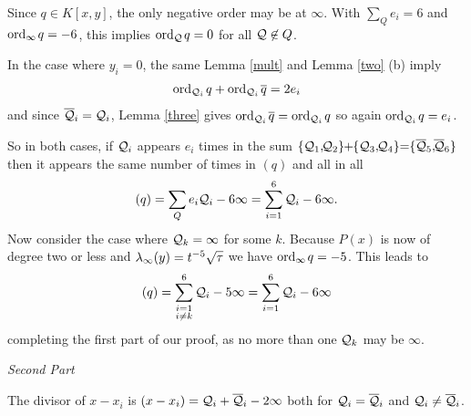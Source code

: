 \documentclass[english,11pt,a4paper]{article}
\begin{document}
Since $q \in K[x,y]$, the only negative order may be at $\infty$. With $\sum_Q e_i = 6$ and $\text{ord}_{\infty}\hspace{0.4mm} q = -6$, this implies $\text{ord}_{\mathcal{Q}}\hspace{0.4mm} q = 0$ for all $\mathcal{Q} \not \in Q$.

In the case where $y_i = 0$, the same Lemma \ref{mult} and Lemma \ref{two} (b) imply
\begin{align*}
  \text{ord}_{\mathcal{Q}_i}\hspace{0.4mm} q + \text{ord}_{\mathcal{Q}_i}\hspace{0.4mm} \overline q = 2e_i
\end{align*}
and since $\overline {\mathcal{Q}}_i = \mathcal{Q}_i$, Lemma \ref{three} gives $\text{ord}_{\mathcal{Q}_i}\hspace{0.4mm} \overline q = \text{ord}_{\mathcal{Q}_i}\hspace{0.4mm} q$ so again $\text{ord}_{\mathcal{Q}_i}\hspace{0.4mm} q = e_i$.

So in both cases, if $\mathcal{Q}_i$ appears $e_i$ times in the sum $\{ \q_1 ,\hspace{-1mm} \q_2\}\hspace{-1mm}+\hspace{-1mm}\{\q_3 ,\hspace{-1mm} \q_4\} \hspace{-1mm}=\hspace{-1mm} \{\bar \q_5 ,\hspace{-1mm} \bar \q_6 \}$ then it appears the same number of times in $(q)$ and all in all
\begin{align*}
  (q) = \sum_Q e_i \mathcal{Q}_i - 6 \infty = \sum_{i=1}^6 \mathcal{Q}_i - 6 \infty.
\end{align*}
Now consider the case where $\mathcal{Q}_k = \infty$ for some $k$. Because $P(x)$ is now of degree two or less and $\lambda_{\infty}(y) = t^{-5}\sqrt \tau$ we have $\text{ord}_{\infty}\hspace{0.4mm} q = -5$. This leads to
\begin{align*}
  (q) = \sum_{\substack{i=1 \\ i \neq k}}^6 \mathcal{Q}_i - 5 \infty = \sum_{i=1}^6 \mathcal{Q}_i - 6 \infty
\end{align*}
completing the first part of our proof, as no more than one $\mathcal{Q}_k$ may be $\infty$.

\newpage
\textit{Second Part}

The divisor of $x - x_i$ is $(x - x_i) = \mathcal{Q}_i + \overline {\mathcal{Q}}_i -2 \infty$ both for $\mathcal{Q}_i = \overline {\mathcal{Q}}_i$ and $\mathcal{Q}_i \neq \overline {\mathcal{Q}}_i$.
\end{document}
